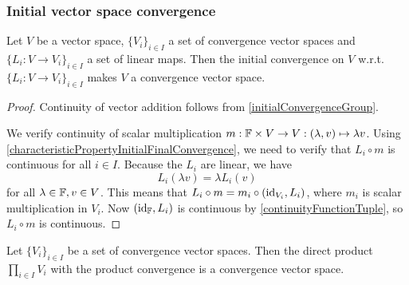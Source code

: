 \subsubsection{Initial vector space convergence}
\begin{proposition} \label{initialVectorSpaceConvergence}
Let $V$ be a vector space, $\{V_i\}_{i\in I}$ a set of convergence vector spaces and $\{L_i: V \to V_i\}_{i\in I}$ a set of linear maps. Then the initial convergence on $V$ w.r.t. $\{L_i: V \to V_i\}_{i\in I}$ makes $V$ a convergence vector space.
\end{proposition}
\begin{proof}
Continuity of vector addition follows from \ref{initialConvergenceGroup}.

We verify continuity of scalar multiplication $m: \mathbb{F}\times V \to V: (\lambda, v) \mapsto \lambda v$. Using \ref{characteristicPropertyInitialFinalConvergence}, we need to verify that $L_i\circ m$ is continuous for all $i\in I$. Because the $L_i$ are linear, we have
\[ L_i(\lambda v) = \lambda L_i(v) \]
for all $\lambda \in \mathbb{F}, v \in V$. This means that $L_i\circ m = m_i \circ (\operatorname{id}_{V_i}, L_i)$, where $m_i$ is scalar multiplication in $V_i$. Now $(\operatorname{id}_{\mathbb{F}}, L_i)$ is continuous by \ref{continuityFunctionTuple}, so $L_i \circ m$ is continuous.
\end{proof}
\begin{corollary}
Let $\{V_i\}_{i\in I}$ be a set of convergence vector spaces. Then the direct product $\prod_{i\in I} V_i$ with the product convergence is a convergence vector space.
\end{corollary}


